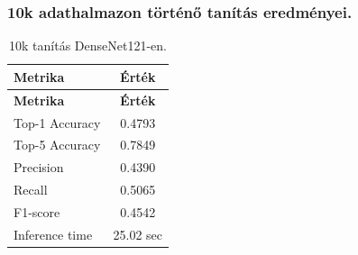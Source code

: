 \subsubsection{10k adathalmazon történő tanítás eredményei.}
  \begin{center}
    \begin{longtable}{l c}
    \caption{10k tanítás DenseNet121-en.} \label{tab:phase03_DenseNet121_10k} \\
    \toprule
    \textbf{Metrika} & \textbf{Érték} \\
    \midrule
    \endfirsthead
    \toprule
    \textbf{Metrika} & \textbf{Érték} \\
    \midrule
    \endhead
    Top-1 Accuracy & 0.4793 \\
    Top-5 Accuracy & 0.7849 \\
    Precision      & 0.4390 \\
    Recall         & 0.5065 \\
    F1-score       & 0.4542 \\
    Inference time & 25.02 sec \\
    \bottomrule
    \end{longtable}
  \end{center}

